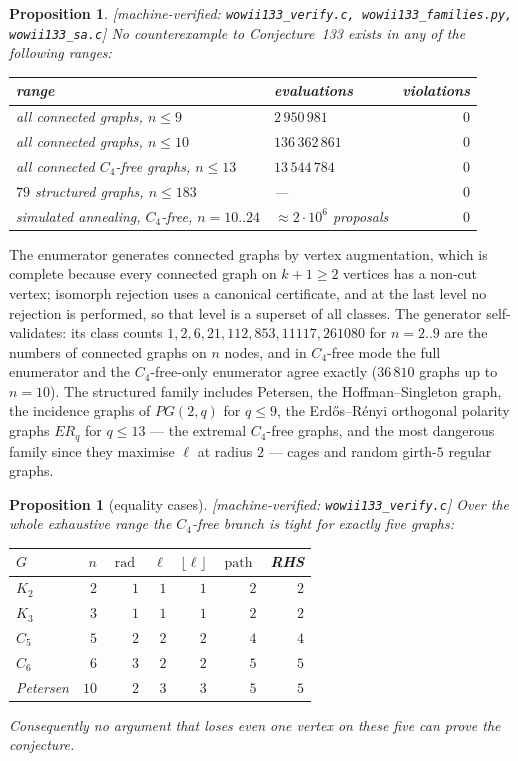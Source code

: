 \documentclass[11pt]{article}
\theoremstyle{plain}
\newtheorem{proposition}[theorem]{Proposition}
\theoremstyle{definition}
\theoremstyle{remark}
\numberwithin{equation}{section}
\newcommand{\rad}{\operatorname{rad}}
\newcommand{\pth}{\operatorname{path}}
\newcommand{\statusbox}[1]{{\small\sloppy\textsf{[#1]}}}
\newcommand{\MV}[1]{\statusbox{machine-verified: \texttt{#1}}}
\begin{document}
\begin{proposition}\label{prop:falsification}
\MV{wowii133\_verify.c, wowii133\_families.py, wowii133\_sa.c}
No counterexample to Conjecture~133 exists in any of the following ranges:
\begin{center}
\small
\begin{tabular}{@{}llr@{}}
\toprule
range & evaluations & violations \\
\midrule
all connected graphs, $n \le 9$ & $2\,950\,981$ & $0$ \\
all connected graphs, $n \le 10$ & $136\,362\,861$ & $0$ \\
all connected $C_4$-free graphs, $n \le 13$ & $13\,544\,784$ & $0$ \\
$79$ structured graphs, $n \le 183$ & --- & $0$ \\
simulated annealing, $C_4$-free, $n = 10..24$ & $\approx 2\cdot 10^{6}$ proposals & $0$ \\
\bottomrule
\end{tabular}
\end{center}
\end{proposition}

The enumerator generates connected graphs by vertex augmentation, which is complete because
every connected graph on $k+1 \ge 2$ vertices has a non-cut vertex; isomorph rejection uses a
canonical certificate, and at the last level no rejection is performed, so that level is a
superset of all classes. The generator self-validates: its class counts
$1, 2, 6, 21, 112, 853, 11117, 261080$ for $n = 2..9$ are the numbers of connected graphs on
$n$ nodes, and in $C_4$-free mode the full enumerator and the $C_4$-free-only enumerator agree
exactly ($36\,810$ graphs up to $n = 10$). The structured family includes Petersen, the
Hoffman--Singleton graph, the incidence graphs of $PG(2,q)$ for $q \le 9$, the
Erd\H{o}s--R\'enyi orthogonal polarity graphs $ER_q$ for $q \le 13$ --- the extremal
$C_4$-free graphs, and the most dangerous family since they maximise $\ell$ at radius $2$ ---
cages and random girth-$5$ regular graphs.

\begin{proposition}[equality cases]\label{prop:tight}
\MV{wowii133\_verify.c}
Over the whole exhaustive range the $C_4$-free branch is tight for exactly five graphs:
\begin{center}
\small
\begin{tabular}{@{}lrrrrrr@{}}
\toprule
$G$ & $n$ & $\rad$ & $\ell$ & $\lfloor\ell\rfloor$ & $\pth$ & RHS \\
\midrule
$K_2$ & $2$ & $1$ & $1$ & $1$ & $2$ & $2$\\
$K_3$ & $3$ & $1$ & $1$ & $1$ & $2$ & $2$\\
$C_5$ & $5$ & $2$ & $2$ & $2$ & $4$ & $4$\\
$C_6$ & $6$ & $3$ & $2$ & $2$ & $5$ & $5$\\
Petersen & $10$ & $2$ & $3$ & $3$ & $5$ & $5$\\
\bottomrule
\end{tabular}
\end{center}
Consequently no argument that loses even one vertex on these five can prove the conjecture.
\end{proposition}
\end{document}
